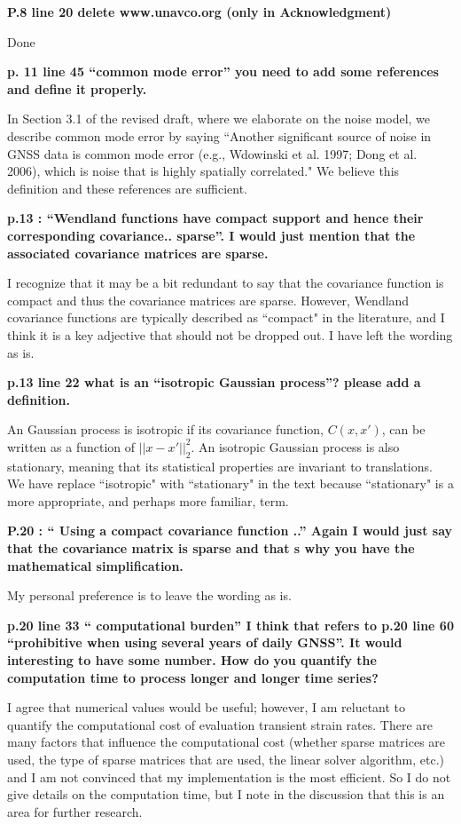 \documentclass[10pt,a4paper]{letter}
\begin{document}
\begin{letter}{}
\textbf{P.8 line 20 delete www.unavco.org (only in Acknowledgment)}

Done

\textbf{p. 11 line 45 “common mode error” you need to add some references and
define it properly.}

In Section 3.1 of the revised draft, where we elaborate on the noise
model, we describe common mode error by saying ``Another significant
source of noise in GNSS data is common mode error (e.g., Wdowinski et
al. 1997; Dong et al. 2006), which is noise that is highly spatially
correlated." We believe this definition and these references are
sufficient.

\textbf{p.13 : “Wendland functions have compact support and hence their
corresponding covariance.. sparse”. I would just mention that the
associated covariance matrices are sparse.}

I recognize that it may be a bit redundant to say that the covariance
function is compact and thus the covariance matrices are sparse.
However, Wendland covariance functions are typically described as
``compact" in the literature, and I think it is a key adjective that
should not be dropped out. I have left the wording as is.

\textbf{p.13 line 22 what is an “isotropic Gaussian process”? please add a
definition.}

An Gaussian process is isotropic if its covariance function,
$C(x,x')$, can be written as a function of $||x - x'||_2^2$. An
isotropic Gaussian process is also stationary, meaning that its
statistical properties are invariant to translations. We have replace
``isotropic" with ``stationary" in the text because ``stationary" is a
more appropriate, and perhaps more familiar, term.

\textbf{P.20 : “ Using a compact covariance function ..” Again I would just
say that the covariance matrix is sparse and that s why you have the
mathematical simplification.}

My personal preference is to leave the wording as is.

\textbf{p.20 line 33 “ computational burden” I think that refers to p.20 line
60 “prohibitive when using several years of daily GNSS”. It would
interesting to have some number. How do you quantify the computation
time to process longer and longer time series?}

I agree that numerical values would be useful; however, I am reluctant
to quantify the computational cost of evaluation transient strain
rates. There are many factors that influence the computational cost
(whether sparse matrices are used, the type of sparse matrices that
are used, the linear solver algorithm, etc.) and I am not convinced
that my implementation is the most efficient. So I do not give details
on the computation time, but I note in the discussion that this is an
area for further research.


\end{letter}
\end{document}
